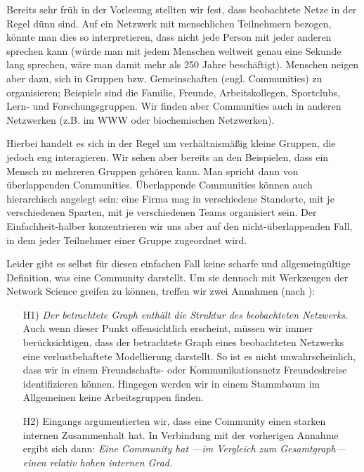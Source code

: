 Bereits sehr früh in der Vorlesung stellten wir fest, dass beobachtete Netze in der Regel dünn sind.
Auf ein Netzwerk mit menschlichen Teilnehmern bezogen, könnte man dies so interpretieren, dass nicht jede Person mit jeder anderen sprechen kann (würde man mit jedem Menschen weltweit genau eine Sekunde lang sprechen, wäre man damit mehr als 250 Jahre beschäftigt).
Menschen neigen aber dazu, sich in Gruppen bzw. Gemeinschaften (engl. Communities) zu organisieren;
Beispiele sind die Familie, Freunde, Arbeitskollegen, Sportclubs, Lern- und Forschungsgruppen.
Wir finden aber Communities auch in anderen Netzwerken (z.B. im WWW oder biochemischen Netzwerken).

Hierbei handelt es sich in der Regel um verhältnismäßig kleine Gruppen, die jedoch eng interagieren.
Wir sehen aber bereits an den Beispielen, dass ein Mensch zu mehreren Gruppen gehören kann.
Man spricht dann von überlappenden Communities.
Überlappende Communities können auch hierarchisch angelegt sein: eine Firma mag in verschiedene Standorte, mit je verschiedenen Sparten, mit je verschiedenen Teams organisiert sein.
Der Einfachheit-halber konzentrieren wir uns aber auf den nicht-überlappenden Fall, in dem jeder Teilnehmer einer Gruppe zugeordnet wird.

Leider gibt es selbst für diesen einfachen Fall keine scharfe und allgemeingültige Definition, was eine Community darstellt.
Um sie dennoch mit Werkzeugen der Network Science greifen zu können, treffen wir zwei Annahmen (nach \cite{barabasi2014network}):

\begin{enumerate}
    \item[H1)]
          \emph{Der betrachtete Graph enthält die Struktur des beobachteten Netzwerks.}
          Auch wenn dieser Punkt offensichtlich erscheint, müssen wir immer berücksichtigen, dass der betrachtete Graph eines beobachteten Netzwerks eine verlustbehaftete Modellierung darstellt.
          So ist es nicht unwahrscheinlich, dass wir in einem Freundschafts- oder Kommunikationsnetz Freundeskreise identifizieren können.
          Hingegen werden wir in einem Stammbaum im Allgemeinen keine Arbeitsgruppen finden.

    \item[H2)]
          Eingangs argumentierten wir, dass eine Community einen starken internen Zusammenhalt hat.
          In Verbindung mit der vorherigen Annahme ergibt sich dann:
          \emph{Eine Community hat ---im Vergleich zum Gesamtgraph--- einen relativ hohen internen Grad.}
\end{enumerate}

